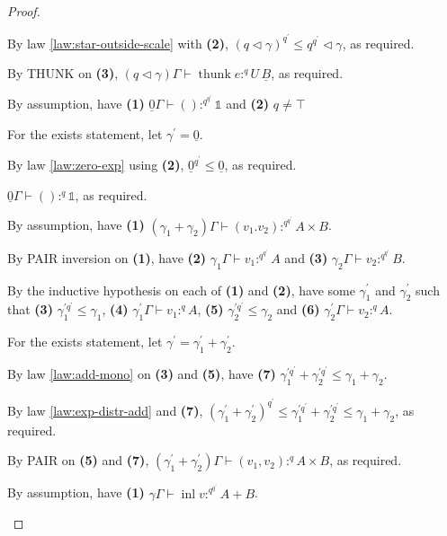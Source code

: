 \documentclass[acmsmall,screen,nonacm]{acmart}
\DeclareMathOperator{\thunk}{\text{thunk}}
\newcommand{\unit}{\mathbb{1}}
\DeclareMathOperator{\inl}{\text{inl}}
\newcommand{\tee}{\vdash}
\DeclareMathOperator{\scale}{\mathbin{\triangleleft}}
\begin{document}
\begin{proof}
\begin{description}
    By law \ref{law:star-outside-scale} with \textbf{(2)}, $(q \scale \gamma)^{q^\prime} \le q^{q^\prime} \scale \gamma$, as required.

    By THUNK on \textbf{(3)}, $(q \scale \gamma)\Gamma \tee \thunk e :^q U \, \underline{B}$, as required.
    \\
    \item[Case UNIT.]
    By assumption, have \textbf{(1)} $\underline{0}\Gamma \tee () :^{q^{q^\prime}} \unit$ and \textbf{(2)} $q \ne \top$

    For the exists statement, let $\gamma^\prime = \underline{0}$.

    By law \ref{law:zero-exp} using \textbf{(2)}, $\underline{0}^{q^\prime} \le \underline{0}$, as required. 

    $\underline{0}\Gamma \tee () :^q \unit$, as required.
    \\
    \item[Case PAIR.]
    By assumption, have \textbf{(1)} $(\gamma_1 + \gamma_2)\Gamma \tee (v_1. v_2) :^{q^{q^\prime}} A \times B$.

    By PAIR inversion on \textbf{(1)}, have \textbf{(2)} $\gamma_1\Gamma \tee v_1 :^{q^{q^\prime}} A$ and \textbf{(3)} $\gamma_2\Gamma \tee v_2 :^{q^{q^\prime}} B$.

    By the inductive hypothesis on each of \textbf{(1)} and \textbf{(2)}, have some $\gamma_1^\prime$ and $\gamma_2^\prime$ such that \textbf{(3)} $\gamma_1^{\prime{q^\prime}} \le \gamma_1$, \textbf{(4)} $\gamma_1^\prime\Gamma \tee v_1 :^q A$, \textbf{(5)} $\gamma_2^{\prime{q^\prime}} \le \gamma_2$ and \textbf{(6)} $\gamma_2^\prime\Gamma \tee v_2 :^q A$.

    For the exists statement, let $\gamma^\prime = \gamma_1^\prime + \gamma_2^\prime$.

    By law \ref{law:add-mono} on \textbf{(3)} and \textbf{(5)}, have \textbf{(7)} $\gamma_1^{\prime{q^\prime}} + \gamma_2^{\prime{q^\prime}} \le \gamma_1 + \gamma_2$.

    By law \ref{law:exp-distr-add} and \textbf{(7)}, $(\gamma_1^\prime + \gamma_2^\prime)^{q^\prime} \le \gamma_1^{\prime{q^\prime}} + \gamma_2^{\prime{q^\prime}} \le \gamma_1 + \gamma_2$, as required.

    By PAIR on \textbf{(5)} and \textbf{(7)}, $(\gamma_1^\prime + \gamma_2^\prime)\Gamma \tee (v_1, v_2) :^q A \times B$, as required.
    \\
    \item[Case INL.]
    By assumption, have \textbf{(1)} $\gamma\Gamma \tee \inl v :^{q^{q^\prime}} A + B$.


\end{description}
\end{proof}
\end{document}
